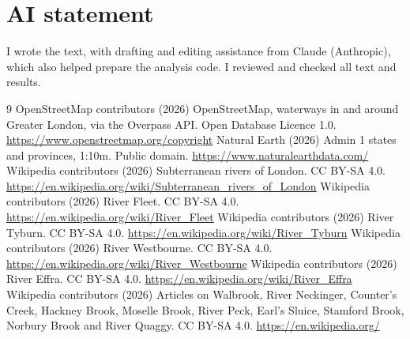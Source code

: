 \documentclass[11pt,a4paper]{article}
\begin{document}
\section*{AI statement}
I wrote the text, with drafting and editing assistance from Claude (Anthropic), which also helped prepare the analysis code. I reviewed and checked all text and results.

\begin{thebibliography}{9}
 OpenStreetMap contributors (2026) OpenStreetMap, waterways in and around Greater London, via the Overpass API. Open Database Licence 1.0. \url{https://www.openstreetmap.org/copyright}
 Natural Earth (2026) Admin 1 states and provinces, 1:10m. Public domain. \url{https://www.naturalearthdata.com/}
 Wikipedia contributors (2026) Subterranean rivers of London. CC BY-SA 4.0. \url{https://en.wikipedia.org/wiki/Subterranean_rivers_of_London}
 Wikipedia contributors (2026) River Fleet. CC BY-SA 4.0. \url{https://en.wikipedia.org/wiki/River_Fleet}
 Wikipedia contributors (2026) River Tyburn. CC BY-SA 4.0. \url{https://en.wikipedia.org/wiki/River_Tyburn}
 Wikipedia contributors (2026) River Westbourne. CC BY-SA 4.0. \url{https://en.wikipedia.org/wiki/River_Westbourne}
 Wikipedia contributors (2026) River Effra. CC BY-SA 4.0. \url{https://en.wikipedia.org/wiki/River_Effra}
 Wikipedia contributors (2026) Articles on Walbrook, River Neckinger, Counter's Creek, Hackney Brook, Moselle Brook, River Peck, Earl's Sluice, Stamford Brook, Norbury Brook and River Quaggy. CC BY-SA 4.0. \url{https://en.wikipedia.org/}
\end{thebibliography}
\end{document}
